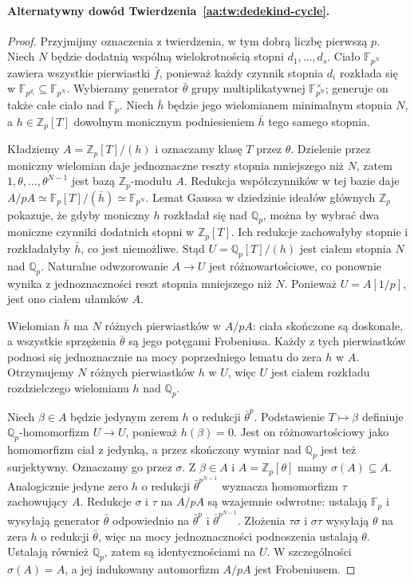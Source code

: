 \paragraph{Alternatywny dowód Twierdzenia~\ref{aa:tw:dedekind-cycle}.}
\begin{proof}
Przyjmijmy oznaczenia z twierdzenia, w tym dobrą liczbę pierwszą $p$.
Niech $N$ będzie dodatnią wspólną wielokrotnością stopni
$d_1,\ldots,d_s$. Ciało $\mathbb F_{p^N}$ zawiera wszystkie
pierwiastki $\bar f$, ponieważ każdy czynnik stopnia $d_i$
rozkłada się w $\mathbb F_{p^{d_i}}\subseteq\mathbb F_{p^N}$.
Wybieramy generator $\bar\theta$ grupy multiplikatywnej
$\mathbb F_{p^N}^{\times}$; generuje on także całe ciało
nad $\mathbb F_p$. Niech $\bar h$ będzie jego wielomianem
minimalnym stopnia $N$, a $h\in\mathbb Z_p[T]$ dowolnym
monicznym podniesieniem $\bar h$ tego samego stopnia.

Kładziemy $A=\mathbb Z_p[T]/(h)$ i oznaczamy klasę $T$
przez $\theta$. Dzielenie przez moniczny wielomian daje
jednoznaczne reszty stopnia mniejszego niż $N$, zatem
$1,\theta,\ldots,\theta^{N-1}$ jest bazą $\mathbb Z_p$-modułu
$A$. Redukcja współczynników w tej bazie daje
$A/pA\simeq\mathbb F_p[T]/(\bar h)\simeq\mathbb F_{p^N}$.
Lemat Gaussa w dziedzinie ideałów głównych $\mathbb Z_p$
pokazuje, że gdyby moniczny $h$ rozkładał się nad $\mathbb Q_p$,
można by wybrać dwa moniczne czynniki dodatnich stopni
w $\mathbb Z_p[T]$. Ich redukcje zachowałyby stopnie
i rozkładałyby $\bar h$, co jest niemożliwe.
Stąd $U=\mathbb Q_p[T]/(h)$ jest ciałem stopnia $N$
nad $\mathbb Q_p$. Naturalne odwzorowanie $A\to U$ jest
różnowartościowe, co ponownie wynika z jednoznaczności reszt
stopnia mniejszego niż $N$. Ponieważ $U=A[1/p]$,
jest ono ciałem ułamków $A$.

Wielomian $\bar h$ ma $N$ różnych pierwiastków w
$A/pA$: ciała skończone są doskonałe, a wszystkie sprzężenia
$\bar\theta$ są jego potęgami Frobeniusa.
Każdy z tych pierwiastków podnosi się jednoznacznie
na mocy poprzedniego lematu do zera $h$ w $A$.
Otrzymujemy $N$ różnych pierwiastków $h$ w $U$,
więc $U$ jest ciałem rozkładu rozdzielczego wielomianu $h$
nad $\mathbb Q_p$.

Niech $\beta\in A$ będzie jedynym zerem $h$ o redukcji
$\bar\theta^p$. Podstawienie $T\mapsto\beta$ definiuje
$\mathbb Q_p$-homomorfizm $U\to U$, ponieważ $h(\beta)=0$.
Jest on różnowartościowy jako homomorfizm ciał z jedynką,
a przez skończony wymiar nad $\mathbb Q_p$ jest też
surjektywny. Oznaczamy go przez $\sigma$.
Z $\beta\in A$ i $A=\mathbb Z_p[\theta]$ mamy
$\sigma(A)\subseteq A$. Analogicznie jedyne zero $h$
o redukcji $\bar\theta^{p^{N-1}}$ wyznacza homomorfizm
$\tau$ zachowujący $A$. Redukcje $\sigma$ i $\tau$ na
$A/pA$ są wzajemnie odwrotne: ustalają $\mathbb F_p$
i wysyłają generator $\bar\theta$ odpowiednio na
$\bar\theta^p$ i $\bar\theta^{p^{N-1}}$.
Złożenia $\tau\sigma$ i $\sigma\tau$ wysyłają $\theta$
na zera $h$ o redukcji $\bar\theta$, więc na mocy
jednoznaczności podnoszenia ustalają $\theta$.
Ustalają również $\mathbb Q_p$, zatem są identycznościami
na $U$. W szczególności $\sigma(A)=A$, a jej indukowany
automorfizm $A/pA$ jest Frobeniusem.


\end{proof}

